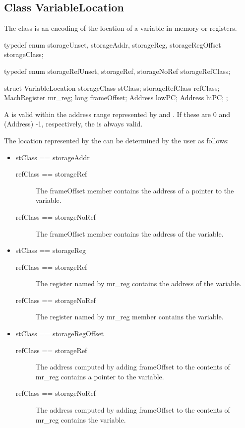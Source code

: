 \subsection{Class VariableLocation}
\label{VariableLocation}


The  class is an encoding of the location of a variable in memory or registers.

\begin{apient}
typedef enum {
   storageUnset,
   storageAddr,
   storageReg,
   storageRegOffset
} storageClass;

typedef enum {
   storageRefUnset,
   storageRef,
   storageNoRef
} storageRefClass;

struct VariableLocation  {
    storageClass stClass;
    storageRefClass refClass;
    MachRegister mr_reg;
    long frameOffset;
    Address lowPC;
    Address hiPC;
};
\end{apient}

A  is valid within the address range represented by  and . If these are 0 and (Address) -1, respectively, the  is always valid.

The location represented by the  can be determined by the user as follows:

\begin{itemize}
\item stClass == storageAddr
\begin{description}
\item[refClass == storageRef] The frameOffset member contains the address of a pointer to the variable.
\item[refClass == storageNoRef] The frameOffset member contains the address of the variable.
\end{description}
\item stClass == storageReg
\begin{description}
\item[refClass == storageRef] The register named by mr\_reg  contains the address of the variable.
\item[refClass == storageNoRef] The register named by mr\_reg member contains the variable.
\end{description}
\item stClass == storageRegOffset
\begin{description}
\item[refClass == storageRef] The address computed by adding frameOffset to the contents of mr\_reg contains a pointer to the variable.
\item[refClass == storageNoRef] The address computed by adding frameOffset to the contents of mr\_reg contains the variable.
\end{description}
\end{itemize}
